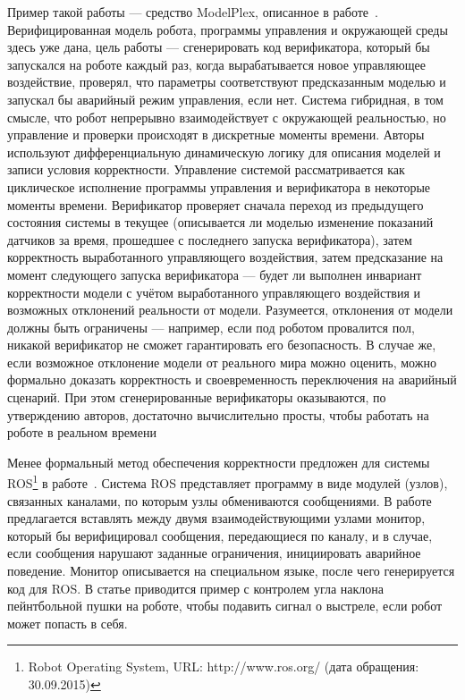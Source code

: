 \documentclass[a4, 14pt]{article}
\begin{document}
Пример такой работы --- средство ModelPlex, описанное в работе~\cite{mitsch2014modelplex}. 
Верифицированная модель робота, программы управления и окружающей среды здесь 
уже дана, цель работы --- сгенерировать код верификатора, который бы запускался 
на роботе каждый раз, когда вырабатывается новое управляющее воздействие, 
проверял, что параметры соответствуют предсказанным моделью и запускал бы 
аварийный режим управления, если нет. Система гибридная, в том смысле, что робот 
непрерывно взаимодействует с окружающей реальностью, но управление и проверки 
происходят в дискретные моменты времени. Авторы используют дифференциальную 
динамическую логику для описания моделей и записи условия корректности. 
Управление системой рассматривается как циклическое исполнение программы 
управления и верификатора в некоторые моменты времени. Верификатор проверяет 
сначала переход из предыдущего состояния системы в текущее (описывается ли 
моделью изменение показаний датчиков за время, прошедшее с последнего запуска 
верификатора), затем корректность выработанного управляющего воздействия, 
затем предсказание на момент следующего запуска верификатора --- будет ли 
выполнен инвариант корректности модели с учётом выработанного управляющего 
воздействия и возможных отклонений реальности от модели. Разумеется, отклонения 
от модели должны быть ограничены --- например, если под роботом провалится пол, 
никакой верификатор не сможет гарантировать его безопасность. В случае же, если 
возможное отклонение модели от реального мира можно оценить, можно формально 
доказать корректность и своевременность переключения на аварийный сценарий. При 
этом сгенерированные верификаторы оказываются, по утверждению авторов, достаточно 
вычислительно просты, чтобы работать на роботе в реальном времени

Менее формальный метод обеспечения корректности предложен для системы 
ROS\footnote{Robot Operating System, URL: http://www.ros.org/ (дата обращения: 30.09.2015)}
в работе~\cite{huang2014rosrv}. Система ROS представляет программу в виде 
модулей (узлов), связанных каналами, по которым узлы обмениваются сообщениями. 
В работе предлагается вставлять между двумя взаимодействующими узлами монитор, 
который бы верифицировал сообщения, передающиеся по каналу, и в случае, если 
сообщения нарушают заданные ограничения, инициировать аварийное поведение. 
Монитор описывается на специальном языке, после чего генерируется код для ROS. 
В статье приводится пример с контролем угла наклона пейнтбольной пушки на 
роботе, чтобы подавить сигнал о выстреле, если робот может попасть в себя.
\end{document}
